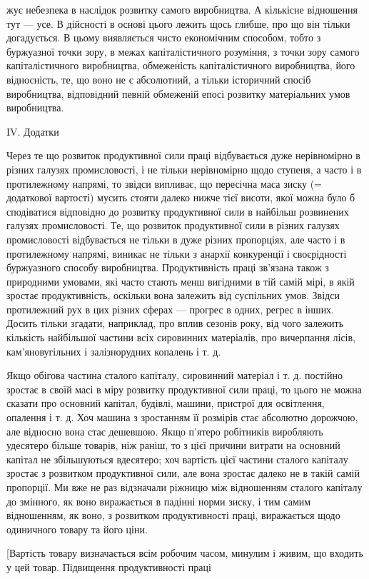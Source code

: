 жує небезпека в наслідок розвитку самого виробництва. А кількісне
відношення тут — усе. В дійсності в основі цього лежить щось
глибше, про що він тільки догадується. В цьому виявляється
чисто економічним способом, тобто з буржуазної точки зору,
в межах капіталістичного розуміння, з точки зору самого капіталістичного
виробництва, обмеженість капіталістичного виробництва,
його відносність, те, що воно не є абсолютний, а тільки
історичний спосіб виробництва, відповідний певній обмеженій
епосі розвитку матеріальних умов виробництва.

IV. Додатки

Через те що розвиток продуктивної сили праці відбувається
дуже нерівномірно в різних галузях промисловості, і не тільки
нерівномірно щодо ступеня, а часто і в протилежному напрямі,
то звідси випливає, що пересічна маса зиску (= додаткової
вартості) мусить стояти далеко нижче тієї висоти, якої можна
було б сподіватися відповідно до розвитку продуктивної сили
в найбільш розвинених галузях промисловості. Те, що розвиток
продуктивної сили в різних галузях промисловості відбувається
не тільки в дуже різних пропорціях, але часто і в протилежному
напрямі, виникає не тільки з анархії конкуренції і своєрідності
буржуазного способу виробництва. Продуктивність праці
зв’язана також з природними умовами, які часто стають менш
вигідними в тій самій мірі, в якій зростає продуктивність, оскільки
вона залежить від суспільних умов. Звідси протилежний рух
в цих різних сферах — прогрес в одних, регрес в інших. Досить
тільки згадати, наприклад, про вплив сезонів року, від чого
залежить кількість найбільшої частини всіх сировинних матеріалів,
про вичерпання лісів, кам’яновугільних і залізнорудних
копалень і т. д.

Якщо обігова частина сталого капіталу, сировинний матеріал
і т. д. постійно зростає в своїй масі в міру розвитку продуктивної
сили праці, то цього не можна сказати про основний
капітал, будівлі, машини, пристрої для освітлення, опалення і т. д.
Хоч машина з зростанням її розмірів стає абсолютно дорожчою,
але відносно вона стає дешевшою. Якщо п’ятеро робітників
виробляють удесятеро більше товарів, ніж раніш, то
з цієї причини витрати на основний капітал не збільшуються
вдесятеро; хоч вартість цієї частини сталого капіталу зростає
з розвитком продуктивної сили, але вона зростає далеко не в такій
самій пропорції. Ми вже не раз відзначали ріжницю між
відношенням сталого капіталу до змінного, як воно виражається
в падінні норми зиску, і тим самим відношенням, як воно,
з розвитком продуктивності праці, виражається щодо одиничного
товару та його ціни.

[Вартість товару визначається всім робочим часом, минулим
і живим, що входить у цей товар. Підвищення продуктивності праці
